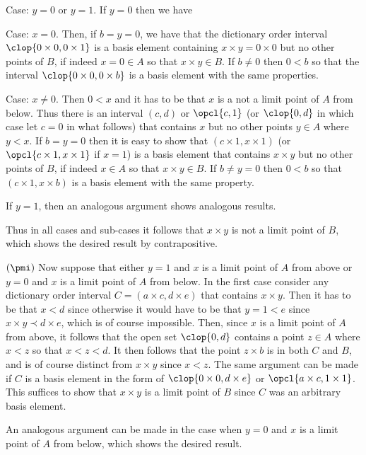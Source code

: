 {{    Case: $y = 0$ or $y = 1$.
    If $y = 0$ then we have
    \begin{indpar}
      Case: $x = 0$.
      Then, if $b = y = 0$, we have that the dictionary order interval $\clop{0 \times 0, 0 \times 1}$ is a basis element containing $x \times y = 0 \times 0$ but no other points of $B$, if indeed $x = 0 \in A$ so that $x \times y \in B$.
      If $b \neq 0$ then $0 < b$ so that the interval $\clop{0 \times 0, 0 \times b}$ is a basis element with the same properties.

      Case: $x \neq 0$.
      Then $0 < x$ and it has to be that $x$ is a not a limit point of $A$ from below.
      Thus there is an interval $(c,d)$ or $\opcl{c,1}$ (or $\clop{0,d}$ in which case let $c=0$ in what follows) that contains $x$ but no other points $y \in A$ where $y < x$.
      If $b = y = 0$ then it is easy to show that $(c \times 1, x \times 1)$ (or $\opcl{c  \times 1, x \times 1}$ if $x = 1$) is a basis element that contains $x \times y$ but no other points of $B$, if indeed $x \in A$ so that $x \times y \in B$.
      If $b \neq y = 0$ then $0 < b$ so that $(c \times 1, x \times b)$ is a basis element with the same property.
    \end{indpar}
    If $y = 1$, then an analogous argument shows analogous results.

    Thus in all cases and sub-cases it follows that $x \times y$ is not a limit point of $B$, which shows the desired result by contrapositive.

    $(\pmi)$ Now suppose that either $y = 1$ and $x$ is a limit point of $A$ from above or $y = 0$ and $x$ is a limit point of $A$ from below.
    In the first case consider any dictionary order interval $C = (a \times c, d \times e)$ that contains $x \times y$.
    Then it has to be that $x < d$ since otherwise it would have to be that $y = 1 < e$ since $x \times y \prec d \times e$, which is of course impossible.
    Then, since $x$ is a limit point of $A$ from above, it follows that the open set $\clop{0,d}$ contains a point $z \in A$ where $x < z$ so that $x < z < d$.
    It then follows that the point $z \times b$ is in both $C$ and $B$, and is of course distinct from $x \times y$ since $x < z$.
    The same argument can be made if $C$ is a basis element in the form of $\clop{0 \times 0, d \times e}$ or $\opcl{a \times c, 1 \times 1}$.
    This suffices to show that $x \times y$ is a limit point of $B$ since $C$ was an arbitrary basis element.

    An analogous argument can be made in the case when $y = 0$ and $x$ is a limit point of $A$ from below, which shows the desired result.
  }

}

